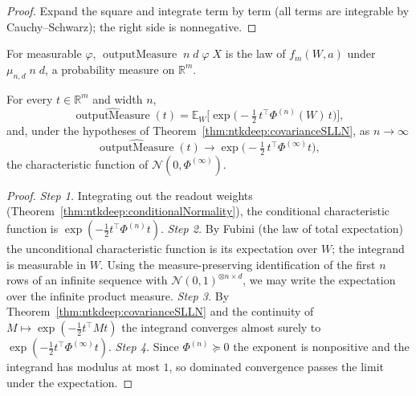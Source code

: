 \begin{proof}
  \leanok
Expand the square and integrate term by term (all terms are integrable by Cauchy--Schwarz); the right side is nonnegative.
\end{proof}

\begin{definition}\label{def:ntkdeep:outputMeasure}
  \leanok
For measurable $\varphi$, $\operatorname{outputMeasure}\;n\;d\;\varphi\;X$ is the law of $f_m(W,a)$ under $\mu_{n,d}\;n\;d$, a probability measure on $\mathbb R^m$.
\end{definition}

\begin{theorem}\label{thm:ntkdeep:charFun}
  \leanok
For every $t\in\mathbb R^m$ and width $n$,
\[
  \widehat{\operatorname{outputMeasure}}(t)=\mathbb E_W\bigl[\exp\bigl(-\tfrac12\,t^\top\Phi^{(n)}(W)\,t\bigr)\bigr],
\]
and, under the hypotheses of Theorem~\ref{thm:ntkdeep:covarianceSLLN}, as $n\to\infty$
\[
  \widehat{\operatorname{outputMeasure}}(t)\longrightarrow\exp\bigl(-\tfrac12\,t^\top\Phi^{(\infty)}t\bigr),
\]
the characteristic function of $\mathcal N(0,\Phi^{(\infty)})$.
\end{theorem}

\begin{proof}
  \leanok
\emph{Step 1.} Integrating out the readout weights (Theorem~\ref{thm:ntkdeep:conditionalNormality}), the conditional characteristic function is $\exp(-\frac12t^\top\Phi^{(n)}t)$. \emph{Step 2.} By Fubini (the law of total expectation) the unconditional characteristic function is its expectation over $W$; the integrand is measurable in $W$.
Using the measure-preserving identification of the first $n$ rows of an infinite sequence with $\mathcal N(0,1)^{\otimes n\times d}$, we may write the expectation over the infinite product measure.
\emph{Step 3.} By Theorem~\ref{thm:ntkdeep:covarianceSLLN} and the continuity of $M\mapsto\exp(-\frac12t^\top Mt)$ the integrand converges almost surely to $\exp(-\frac12t^\top\Phi^{(\infty)}t)$.
\emph{Step 4.} Since $\Phi^{(n)}\succeq0$ the exponent is nonpositive and the integrand has modulus at most $1$, so dominated convergence passes the limit under the expectation.
\end{proof}

